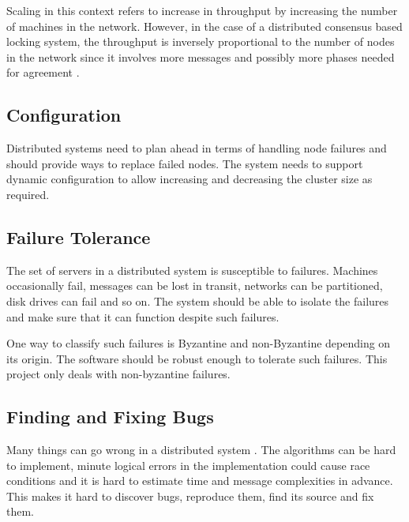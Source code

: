 Scaling in this context refers to increase in throughput by increasing the
number of machines in the network. However, in the case of a distributed
consensus based locking system, the throughput is inversely proportional to the
number of nodes in the network since it involves more messages and possibly
more phases needed for agreement%
.

\subsection{Configuration}

Distributed systems need to plan ahead in terms of handling node failures and
should provide ways to replace failed nodes. The system needs to support dynamic
configuration to allow increasing and decreasing the cluster size as required.

\subsection{Failure Tolerance}

The set of servers in a distributed system is susceptible to failures.
Machines occasionally fail, messages can be lost in transit, networks can be
partitioned, disk drives can fail and so on. The system should be able to
isolate the failures and make sure that it can function despite such failures.

One way to classify such failures is Byzantine%
and non-Byzantine%
depending on its origin. The software should be robust enough to tolerate such
failures. This project only deals with non-byzantine failures.

\subsection{Finding and Fixing Bugs}

Many things can go wrong in a distributed system
\citep{Rotem-gal-oz_fallaciesof}. The algorithms can be hard to implement,
minute logical errors in the implementation could cause race conditions and
it is hard to estimate time and message complexities in advance. This makes it
hard to discover bugs, reproduce them, find its source and fix them.

